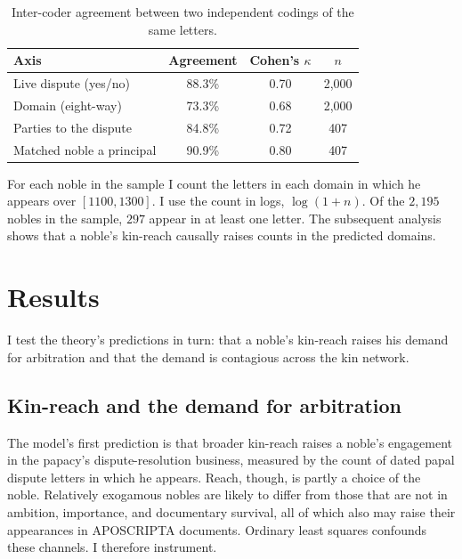 \documentclass[12pt]{article}
\theoremstyle{definition}
\theoremstyle{remark}
\begin{document}
\begin{table}[t]
\centering
\caption{Inter-coder agreement between two independent codings of the same letters.}
\label{tab:kappa}
\begin{tabular}{lccc}
\toprule
Axis & Agreement & Cohen's $\kappa$ & $n$ \\
\midrule
Live dispute (yes/no) & 88.3\% & 0.70 & 2{,}000 \\
Domain (eight-way) & 73.3\% & 0.68 & 2{,}000 \\
Parties to the dispute & 84.8\% & 0.72 & 407 \\
Matched noble a principal & 90.9\% & 0.80 & 407 \\
\bottomrule
\end{tabular}
\end{table}

For each noble in the sample I count the letters in each domain in which he appears over $[1100,1300]$. I use the count in logs, $\log(1+n)$. Of the $2{,}195$ nobles in the sample, $297$ appear in at least one letter. The subsequent analysis shows that a noble's kin-reach causally raises counts in the predicted domains.




\section{Results}
\label{sec:results}

I test the theory's predictions in turn: that a noble's kin-reach raises his demand for arbitration and that the demand is contagious across the kin network.

\subsection{Kin-reach and the demand for arbitration}
\label{sub:forward}

The model's first prediction is that broader kin-reach raises a noble's engagement in the papacy's dispute-resolution business, measured by the count of dated papal dispute letters in which he appears. Reach, though, is partly a choice of the noble. Relatively exogamous nobles are likely to differ from those that are not in ambition, importance, and documentary survival, all of which also may raise their appearances in APOSCRIPTA documents. Ordinary least squares confounds these channels. I therefore instrument.
\end{document}
